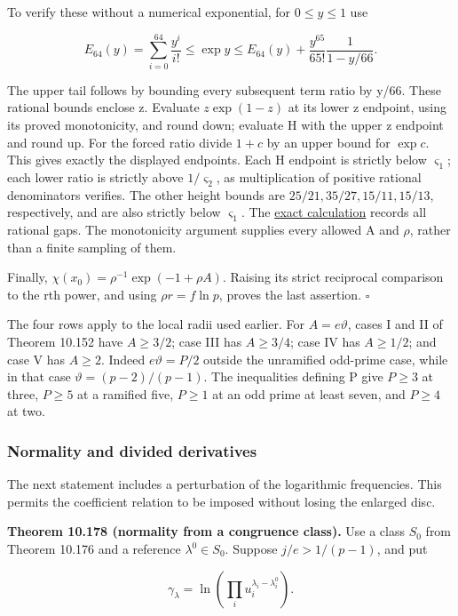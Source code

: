 \documentclass[
  11pt,
  a4paper,
]{article}
\begin{document}
To verify these without a numerical exponential, for \(0\le y\le1\) use

\[
E_{64}(y)=\sum_{i=0}^{64}\frac{y^i}{i!}
\le\exp y\le E_{64}(y)+\frac{y^{65}}{65!}\frac1{1-y/66}.
\tag{10.672}
\]

The upper tail follows by bounding every subsequent term ratio by y/66.
These rational bounds enclose z. Evaluate \(z\exp(1-z)\) at its lower z
endpoint, using its proved monotonicity, and round down; evaluate H with
the upper z endpoint and round up. For the forced ratio divide \(1+c\)
by an upper bound for \(\exp c\). This gives exactly the displayed
endpoints. Each H endpoint is strictly below \(\varsigma_1\); each lower
ratio is strictly above \(1/\varsigma_2\), as multiplication of positive
rational denominators verifies. The other height bounds are
\(25/21,35/27,15/11,15/13\), respectively, and are also strictly below
\(\varsigma_1\). The
\href{../figure_sources/yu_congruence_clusters.py}{exact calculation}
records all rational gaps. The monotonicity argument supplies every
allowed A and \(\rho\), rather than a finite sampling of them.

Finally, \(\chi(x_0)=\rho^{-1}\exp(-1+\rho A)\). Raising its strict
reciprocal comparison to the rth power, and using \(\rho r=f\ln p\),
proves the last assertion. \(\square\)

The four rows apply to the local radii used earlier. For
\(A=e\vartheta\), cases I and II of Theorem 10.152 have \(A\ge3/2\);
case III has \(A\ge3/4\); case IV has \(A\ge1/2\); and case V has
\(A\ge2\). Indeed \(e\vartheta=P/2\) outside the unramified odd-prime
case, while in that case \(\vartheta=(p-2)/(p-1)\). The inequalities
defining P give \(P\ge3\) at three, \(P\ge5\) at a ramified five,
\(P\ge1\) at an odd prime at least seven, and \(P\ge4\) at two.

\subsubsection{Normality and divided
derivatives}\label{normality-and-divided-derivatives}

The next statement includes a perturbation of the logarithmic
frequencies. This permits the coefficient relation to be imposed without
losing the enlarged disc.

\textbf{Theorem 10.178 (normality from a congruence class).} Use a class
\(S_0\) from Theorem 10.176 and a reference \(\lambda^0\in S_0\).
Suppose \(j/e>1/(p-1)\), and put

\[
\gamma_\lambda=\ln\left(\prod_i u_i^{\lambda_i-\lambda_i^0}\right).
\tag{10.673}
\]
\end{document}
